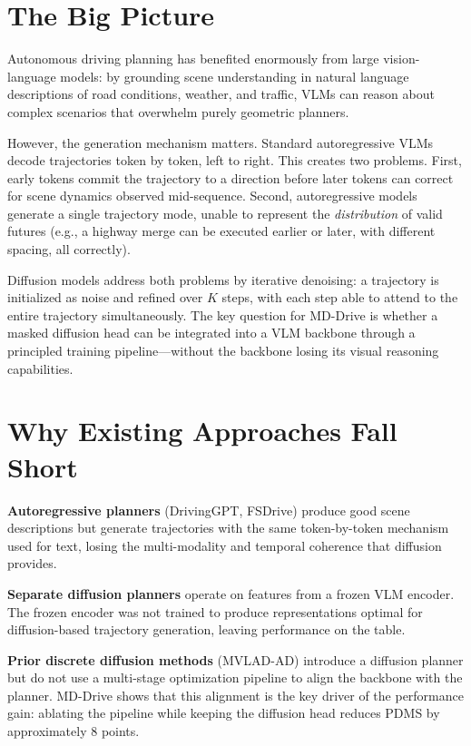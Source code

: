 \documentclass[10pt,twocolumn]{article}
\begin{document}
\section{The Big Picture}

Autonomous driving planning has benefited enormously from large vision-language models: by grounding scene understanding in natural language descriptions of road conditions, weather, and traffic, VLMs can reason about complex scenarios that overwhelm purely geometric planners.

However, the generation mechanism matters.
Standard autoregressive VLMs decode trajectories token by token, left to right.
This creates two problems.
First, early tokens commit the trajectory to a direction before later tokens can correct for scene dynamics observed mid-sequence.
Second, autoregressive models generate a single trajectory mode, unable to represent the \emph{distribution} of valid futures (e.g., a highway merge can be executed earlier or later, with different spacing, all correctly).

Diffusion models address both problems by iterative denoising: a trajectory is initialized as noise and refined over $K$ steps, with each step able to attend to the entire trajectory simultaneously.
The key question for MD-Drive is whether a masked diffusion head can be integrated into a VLM backbone through a principled training pipeline---without the backbone losing its visual reasoning capabilities.

\section{Why Existing Approaches Fall Short}

\textbf{Autoregressive planners} (DrivingGPT, FSDrive) produce good scene descriptions but generate trajectories with the same token-by-token mechanism used for text, losing the multi-modality and temporal coherence that diffusion provides.

\textbf{Separate diffusion planners} operate on features from a frozen VLM encoder.
The frozen encoder was not trained to produce representations optimal for diffusion-based trajectory generation, leaving performance on the table.

\textbf{Prior discrete diffusion methods} (MVLAD-AD) introduce a diffusion planner but do not use a multi-stage optimization pipeline to align the backbone with the planner.
MD-Drive shows that this alignment is the key driver of the performance gain: ablating the pipeline while keeping the diffusion head reduces PDMS by approximately 8 points.
\end{document}
